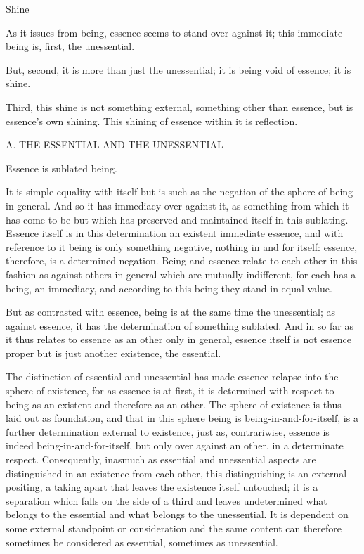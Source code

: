 Shine

As it issues from being, essence seems to stand over against it;
this immediate being is, first, the unessential.

But, second, it is more than just the unessential;
it is being void of essence; it is shine.

Third, this shine is not something external,
something other than essence, but is essence's own shining.
This shining of essence within it is reflection.

A. THE ESSENTIAL AND THE UNESSENTIAL

Essence is sublated being.

It is simple equality with itself
but is such as the negation of
the sphere of being in general.
And so it has immediacy over against it,
as something from which it has come to be but which has
preserved and maintained itself in this sublating.
Essence itself is in this determination
an existent immediate essence,
and with reference to it
being is only something negative,
nothing in and for itself:
essence, therefore, is a determined negation.
Being and essence relate to each other in this fashion
as against others in general which are mutually indifferent,
for each has a being, an immediacy,
and according to this being they stand in equal value.

But as contrasted with essence,
being is at the same time the unessential;
as against essence, it has the determination of something sublated.
And in so far as it thus relates to essence
as an other only in general,
essence itself is not essence proper
but is just another existence, the essential.

The distinction of essential and unessential has
made essence relapse into the sphere of existence,
for as essence is at first,
it is determined with respect to being
as an existent and therefore as an other.
The sphere of existence is thus laid out as foundation,
and that in this sphere being is being-in-and-for-itself,
is a further determination external to existence,
just as, contrariwise, essence is indeed being-in-and-for-itself,
but only over against an other, in a determinate respect.
Consequently, inasmuch as essential and unessential aspects are
distinguished in an existence from each other,
this distinguishing is an external positing,
a taking apart that leaves the existence itself untouched;
it is a separation which falls on the side of
a third and leaves undetermined 
what belongs to the essential
and what belongs to the unessential.
It is dependent on some external standpoint or consideration
and the same content can therefore sometimes be considered
as essential, sometimes as unessential.


